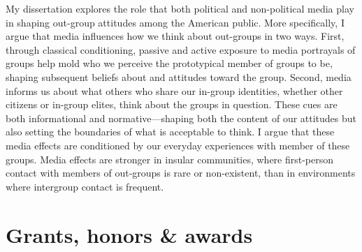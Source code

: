 \documentclass[11pt, a4paper]{article}
\begin{document}
My dissertation explores the role that both political and non-political media play in shaping out-group attitudes among the American public. More specifically, I argue that media influences how we think about out-groups in two ways. First, through classical conditioning, passive and active exposure to media portrayals of groups help mold who we perceive the prototypical member of groups to be, shaping subsequent beliefs about and attitudes toward the group. Second, media informs us about what others who share our in-group identities, whether other citizens or in-group elites, think about the groups in question. These cues are both informational and normative---shaping both the content of our attitudes but also setting the boundaries of what is acceptable to think. I argue that these media effects are conditioned by our everyday experiences with member of these groups. Media effects are stronger in insular communities, where first-person contact with members of out-groups is rare or non-existent, than in environments where intergroup contact is frequent.

\section*{Grants, honors \& awards}
\end{document}
